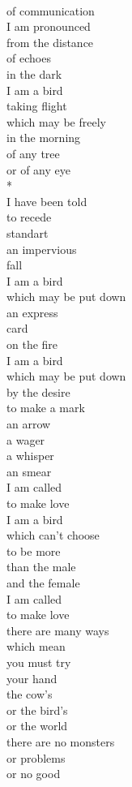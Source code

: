 \documentclass[smalldemyvopaper,11pt,twoside,onecolumn,openright,extrafontsizes]{memoir}
\begin{document}
\\of communication
\\I am pronounced
\\from the distance
\\of echoes
\\in the dark
\\I am a bird
\\taking flight
\\which may be freely
\\in the morning
\\of any tree
\\or of any eye
\\*
\\I have been told
\\to recede
\\standart
\\an impervious
\\fall
\\I am a bird
\\which may be put down
\\an express
\\card
\\on the fire
\\I am a bird
\\which may be put down
\\by the desire
\\to make a mark
\\an arrow
\\a wager
\\a whisper
\\an smear
\\I am called
\\to make love
\\I am a bird
\\which can't choose
\\to be more
\\than the male
\\and the female
\\I am called
\\to make love
\\there are many ways
\\which mean
\\you must try
\\your hand
\\the cow's
\\or the bird's
\\or the world
\\there are no monsters
\\or problems
\\or no good
\end{document}
